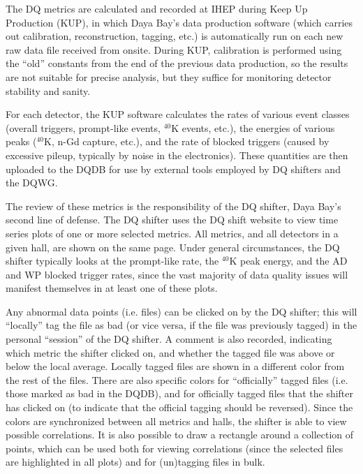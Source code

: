 \documentclass[../thesis.tex]{subfiles}
\begin{document}
The DQ metrics are calculated and recorded at IHEP during Keep Up Production (KUP), in which Daya Bay's data production software (which carries out calibration, reconstruction, tagging, etc.) is automatically run on each new raw data file received from onsite. During KUP, calibration is performed using the ``old'' constants from the end of the previous data production, so the results are not suitable for precise analysis, but they suffice for monitoring detector stability and sanity.

For each detector, the KUP software calculates the rates of various event classes (overall triggers, prompt-like events, $^{40}$K events, etc.), the energies of various peaks ($^{40}$K, n-Gd capture, etc.), and the rate of blocked triggers (caused by excessive pileup, typically by noise in the electronics). These quantities are then uploaded to the DQDB for use by external tools employed by DQ shifters and the DQWG.

The review of these metrics is the responsibility of the DQ shifter, Daya Bay's second line of defense. The DQ shifter uses the DQ shift website to view time series plots of one or more selected metrics. All metrics, and all detectors in a given hall, are shown on the same page. Under general circumstances, the DQ shifter typically looks at the prompt-like rate, the $^{40}$K peak energy, and the AD and WP blocked trigger rates, since the vast majority of data quality issues will manifest themselves in at least one of these plots.

Any abnormal data points (i.e. files) can be clicked on by the DQ shifter; this will ``locally'' tag the file as bad (or vice versa, if the file was previously tagged) in the personal ``session'' of the DQ shifter. A comment is also recorded, indicating which metric the shifter clicked on, and whether the tagged file was above or below the local average. Locally tagged files are shown in a different color from the rest of the files. There are also specific colors for ``officially'' tagged files (i.e. those marked as bad in the DQDB), and for officially tagged files that the shifter has clicked on (to indicate that the official tagging should be reversed). Since the colors are synchronized between all metrics and halls, the shifter is able to view possible correlations. It is also possible to draw a rectangle around a collection of points, which can be used both for viewing correlations (since the selected files are highlighted in all plots) and for (un)tagging files in bulk. 
\end{document}
